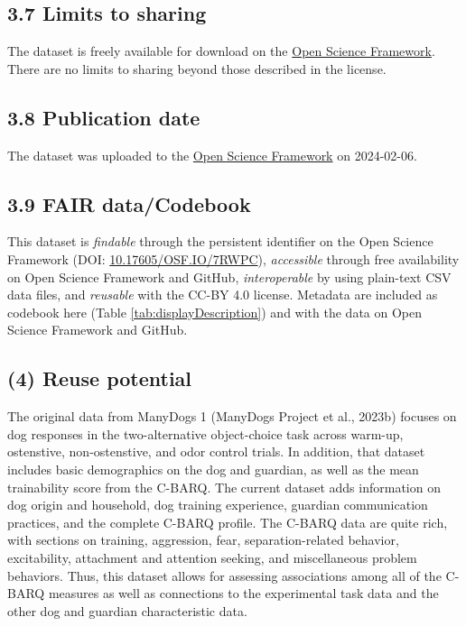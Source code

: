 \documentclass[
  pub,floatsintext]{apa6}
\begin{document}
\hypertarget{limits-to-sharing}{%
\subsection{3.7 Limits to sharing}\label{limits-to-sharing}}

The dataset is freely available for download on the \href{https://doi.org/10.17605/OSF.IO/7RWPC}{Open Science Framework}. There are no limits to sharing beyond those described in the license.

\hypertarget{publication-date}{%
\subsection{3.8 Publication date}\label{publication-date}}

The dataset was uploaded to the \href{https://doi.org/10.17605/OSF.IO/7RWPC}{Open Science Framework} on 2024-02-06.

\hypertarget{fair-datacodebook}{%
\subsection{3.9 FAIR data/Codebook}\label{fair-datacodebook}}

This dataset is \emph{findable} through the persistent identifier on the Open Science Framework (DOI: \href{https://doi.org/10.17605/OSF.IO/7RWPC}{10.17605/OSF.IO/7RWPC}), \emph{accessible} through free availability on Open Science Framework and GitHub, \emph{interoperable} by using plain-text CSV data files, and \emph{reusable} with the CC-BY 4.0 license. Metadata are included as codebook here (Table \ref{tab:displayDescription}) and with the data on Open Science Framework and GitHub.

\hypertarget{reuse-potential}{%
\subsection{(4) Reuse potential}\label{reuse-potential}}

The original data from ManyDogs 1 (ManyDogs Project et al., 2023b) focuses on dog responses in the two-alternative object-choice task across warm-up, ostenstive, non-ostenstive, and odor control trials. In addition, that dataset includes basic demographics on the dog and guardian, as well as the mean trainability score from the C-BARQ. The current dataset adds information on dog origin and household, dog training experience, guardian communication practices, and the complete C-BARQ profile. The C-BARQ data are quite rich, with sections on training, aggression, fear, separation-related behavior, excitability, attachment and attention seeking, and miscellaneous problem behaviors. Thus, this dataset allows for assessing associations among all of the C-BARQ measures as well as connections to the experimental task data and the other dog and guardian characteristic data.
\end{document}
